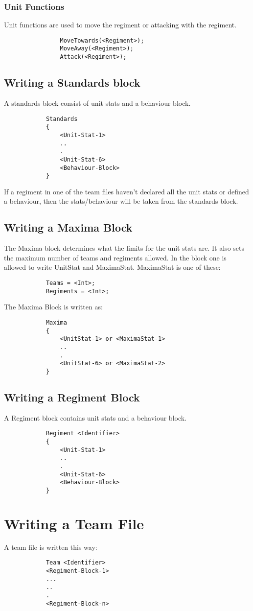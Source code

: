 		\subsubsection{Unit Functions}
			Unit functions are used to move the regiment or attacking with the regiment.
			\begin{verbatim}
				MoveTowards(<Regiment>);
				MoveAway(<Regiment>);
				Attack(<Regiment>);
			\end{verbatim}
	\subsection{Writing a Standards block}
		A standards block consist of unit stats and a behaviour block. 
		\begin{verbatim}
			Standards
			{
				<Unit-Stat-1>
				..
				.
				<Unit-Stat-6>
				<Behaviour-Block>
			}
		\end{verbatim}
		If a regiment in one of the team files haven't declared all the unit stats
		or defined a behaviour, then the stats/behaviour will be taken from the standards block.
	\subsection{Writing a Maxima Block}
		The Maxima block determines what the limits for the unit stats are. It also sets the maximum number of teams and regiments allowed.
		In the block one is allowed to write UnitStat and MaximaStat.
		MaximaStat is one of these:\\
		\begin{verbatim}
			Teams = <Int>;
			Regiments = <Int>;
		\end{verbatim}
		The Maxima Block is written as: \\
		\begin{verbatim}
			Maxima
			{
				<UnitStat-1> or <MaximaStat-1>
				..
				.
				<UnitStat-6> or <MaximaStat-2>
			}
		\end{verbatim}
	\subsection{Writing a Regiment Block}
		A Regiment block contains unit stats and a behaviour block.
		\begin{verbatim}
			Regiment <Identifier>
			{
				<Unit-Stat-1>
				..
				.
				<Unit-Stat-6>
				<Behaviour-Block>
			}
		\end{verbatim}
		
\section{Writing a Team File}
\label{doc:teamfile}
	A team file is written this way: \\
		\begin{verbatim}
			Team <Identifier>
			<Regiment-Block-1>
			...
			..
			.
			<Regiment-Block-n>
		\end{verbatim}
	
